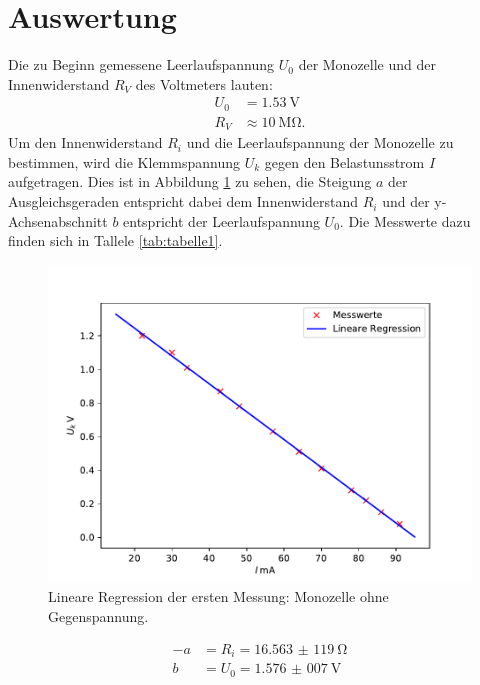\section{Auswertung}
Die zu Beginn gemessene Leerlaufspannung $U_{0}$ der Monozelle und der
Innenwiderstand $R_{V}$ des Voltmeters lauten:
\begin{align*}
  U_{0} &= \SI{1,53}{\volt} \\
  R_{V} &\approx \SI{10}{\Mohm}.
\end{align*}
\noindent Um den Innenwiderstand $R_{i}$ und die Leerlaufspannung der Monozelle zu
bestimmen, wird die Klemmspannung $U_{k}$ gegen den Belastunsstrom $I$ aufgetragen.
Dies ist in Abbildung \ref{fig:plot1} zu sehen, die Steigung $a$ der Ausgleichsgeraden
entspricht dabei dem Innenwiderstand $R_{i}$ und der y-Achsenabschnitt $b$ entspricht
der Leerlaufspannung $U_{0}$.
Die Messwerte dazu finden sich in Tallele \ref{tab:tabelle1}.

\begin{figure}[H]
  \centering
  \includegraphics{plot1.pdf}
  \caption{Lineare Regression der ersten Messung: Monozelle ohne Gegenspannung.}
  \label{fig:plot1}
\end{figure}

\begin{align*}
  -a &= R_{i} = \SI{16,563(119)}{\ohm} \\
  b &= U_{0} = \SI{1,576(007)}{\volt}
\end{align*}

